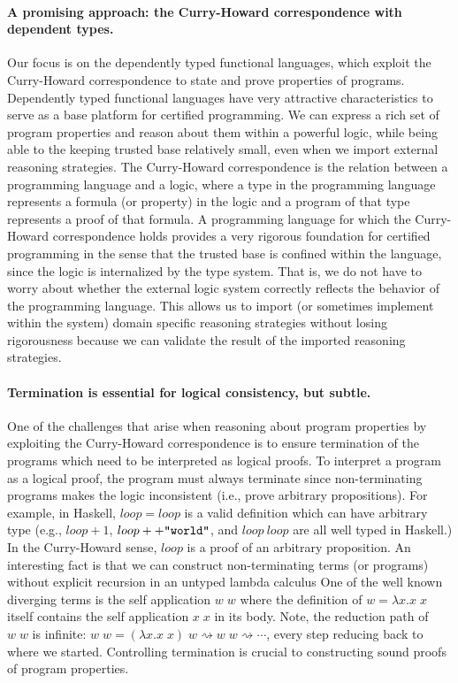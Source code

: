 \documentclass[letterpaper,12pt]{article}
\newcommand{\eg}[0]{e.g., }
\begin{document}
\paragraph{A promising approach: the Curry-Howard correspondence
with dependent types.}
Our focus is on the dependently typed functional languages, which exploit
the Curry-Howard correspondence to state and prove properties of programs.
Dependently typed functional languages have very attractive characteristics
to serve as a base platform for certified programming.
We can express a rich set of program properties and reason about them
within a powerful logic, while being able to the keeping trusted base
relatively small, even when we import external reasoning strategies.
The Curry-Howard correspondence is the relation between a programming
language and a logic, where a type in the programming language represents
a formula (or property) in the logic and a program of that type represents
a proof of that formula.
A programming language for which the Curry-Howard correspondence holds
provides a very rigorous foundation for certified programming in the sense
that the trusted base is confined within the language, since the logic is
internalized by the type system. That is, we do not have to worry about
whether the external logic system correctly reflects the behavior of the
programming language.  This allows us to import (or sometimes implement
within the system) domain specific reasoning strategies without losing
rigorousness because we can validate the result of the imported reasoning
strategies.

\paragraph{Termination is essential for logical consistency, but subtle.}
One of the challenges that arise when reasoning about program properties
by exploiting the Curry-Howard correspondence is to ensure termination of
the programs which need to be interpreted as logical proofs.
To interpret a program as a logical proof, the program must always terminate
since non-terminating programs makes the logic inconsistent
(i.e., prove arbitrary propositions).  For example, in Haskell, $loop = loop$
is a valid definition which can have arbitrary type (\eg $loop + 1$,
$loop ++ \text{\texttt{"world"}}$, and $loop~loop$ are all well typed
in Haskell.)  In the Curry-Howard sense, $loop$ is a proof of an
arbitrary proposition.
An interesting fact is that we can construct non-terminating terms
(or programs) without explicit recursion in an untyped lambda calculus
One of the well known diverging terms is the self application $w\;w$ where
the definition of $w=\lambda x.x\;x$ itself contains the self application
$x\;x$ in its body.  Note, the reduction path of $w\;w$ is infinite:
$w\;w = (\lambda x.x\;x)\;w \rightsquigarrow w\;w \rightsquigarrow \cdots$,
every step reducing back to where we started.  Controlling termination
is crucial to constructing sound proofs of program properties.
\end{document}

